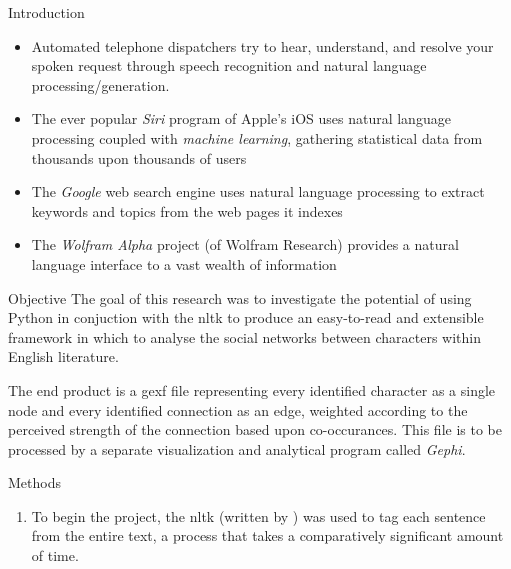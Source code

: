 \documentclass{beamer}
\newcommand{\Gephi}{\textit{Gephi}\xspace}
\begin{document}
\begin{frame}[t,fragile]{}
\begin{columns}
\begin{column}{.45\textwidth}
\begin{block}{Introduction}
        \begin{itemize}
          \addtolength{\itemsep}{1ex}
        \item Automated telephone dispatchers try to hear, understand,
          and resolve your spoken request through speech recognition
          and natural language processing/generation.
        \item The ever popular \textit{Siri} program of Apple's iOS
          uses natural language processing coupled with
          \textit{machine learning}, gathering statistical data from
          thousands upon thousands of users \parencite{lohr12:big-data-age}
        \item The \textit{Google} web search engine uses natural
          language processing to extract keywords and topics from the
          web pages it indexes \parencite{ganchev12:search-logs-query-tagging}
        \item The \textit{Wolfram Alpha} project (of Wolfram Research)
          provides a natural language interface to a vast wealth of
          information \parencite{press:wolfram09:wa-launch}
        \end{itemize}
      \end{block}


      \begin{block}{Objective}
        The goal of this research was to investigate the potential of
        using Python in conjuction with the
        \ac{nltk} \parencite{bird09:nltk} to produce an easy-to-read
        and extensible framework in which to analyse the social
        networks between characters within English literature.

        The end product is a \ac{gexf} file representing every
        identified character as a single node and every identified
        connection as an edge, weighted according to the perceived
        strength of the connection based upon co-occurances.  This
        file is to be processed by a separate visualization and
        analytical program called \Gephi.
      \end{block}
      \begin{block}{Methods}
        \begin{enumerate}
          \addtolength{\itemsep}{1ex}
        \item To begin the project, the \ac{nltk} (written by
          \cite{bird09:nltk}) was used to tag each sentence from the
          entire text, a process that takes a comparatively significant
          amount of time.
          

\end{enumerate}
\end{block}
\end{column}
\end{columns}
\end{frame}
\end{document}
